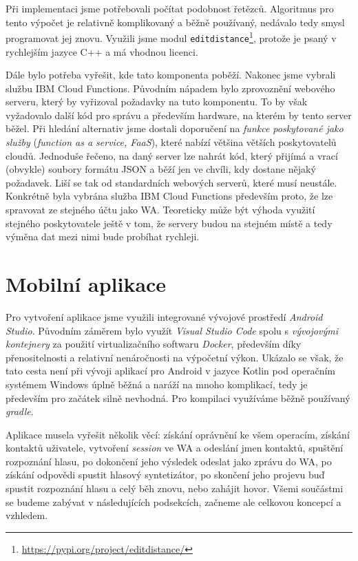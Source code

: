 Při implementaci jsme potřebovali počítat podobnost řetězců. Algoritmus
pro tento výpočet je relativně komplikovaný a běžně používaný, nedávalo tedy
smysl programovat jej znovu. Využili jsme modul
\texttt{editdistance}\footnote{\url{https://pypi.org/project/editdistance/}},
protože je psaný v rychlejším jazyce C++ a má vhodnou licenci.

Dále bylo potřeba vyřešit, kde tato komponenta poběží. Nakonec jsme vybrali
službu IBM Cloud Functions. Původním nápadem bylo
zprovoznění webového serveru, který by vyřizoval požadavky na tuto komponentu.
To by však vyžadovalo další kód pro správu a především hardware, na kterém by
tento server běžel. Při hledání alternativ jsme dostali doporučení na
\textit{funkce poskytované jako služby} (\textit{function as a service, FaaS}),
které nabízí většina větších poskytovatelů cloudů. Jednoduše řečeno, na daný
server lze nahrát kód, který přijímá a vrací (obvykle) soubory formátu JSON a
běží jen ve chvíli, kdy dostane nějaký požadavek. Liší se tak od standardních
webových serverů, které musí  neustále. Konkrétně byla vybrána
služba IBM Cloud Functions především proto, že lze spravovat ze stejného účtu jako
WA. Teoreticky může být výhoda využití stejného poskytovatele ještě v tom, že
servery budou na stejném místě a tedy výměna dat mezi nimi bude probíhat rychleji.

\section{Mobilní aplikace}\label{app}

Pro vytvoření aplikace jsme využili integrované vývojové prostředí
\textit{Android Studio}. Původním záměrem bylo využít \textit{Visual Studio Code}
spolu s \textit{vývojovými kontejnery} za použití virtualizačního softwaru
\textit{Docker}, především díky přenositelnosti a relativní nenáročnosti
na výpočetní výkon. Ukázalo se však, že tato cesta není při vývoji aplikací
pro Android v jazyce Kotlin pod operačním systémem Windows úplně běžná a
naráží na mnoho komplikací, tedy je především pro začátek silně nevhodná.
Pro kompilaci využíváme běžně používaný \textit{gradle}.

Aplikace musela vyřešit několik věcí: získání oprávnění ke všem operacím,
získání kontaktů uživatele, vytvoření \textit{session} ve WA a odeslání
jmen kontaktů, spuštění rozpoznání hlasu, po dokončení jeho výsledek odeslat
jako zprávu do WA, po získání odpovědi spustit hlasový syntetizátor, po skončení
jeho projevu buď spustit rozpoznání hlasu a celý běh znovu, nebo zahájit
hovor. Všemi součástmi se budeme zabývat v následujících podsekcích, začneme
ale celkovou koncepcí a vzhledem.

